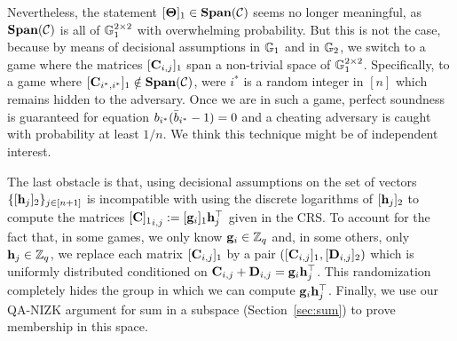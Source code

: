 Nevertheless, the statement $[\mathbf{{\Theta}}]_1\in\mathbf{Span}(\mathcal{C})$ seems no longer meaningful, as $\mathbf{Span}(\mathcal{C})$ is all of $\mathbb{G}_1^{2\times 2}$ with overwhelming probability. But this is not the case, because by means of decisional assumptions in $\mathbb{G}_1$ and in $\mathbb{G}_2$, we switch to a game where the matrices
$[\mathbf{{C}}_{i,j}]_1$ span a non-trivial space of $\mathbb{G}_1^{2 \times 2}$. Specifically, to a game where $[\mathbf{{C}}_{i^*,i^*}]_1\notin\mathbf{Span}(\mathcal{C})$, were $i^*$ is a random integer in $[n]$ which remains hidden to the adversary. Once we are in such a game, perfect soundness is guaranteed for equation $b_{i^*}(\bar{b}_{i^*}-1)=0$ and a cheating adversary is caught with probability at least $1/n$. We think this technique might be of independent interest.

The last obstacle is that, 
  using decisional assumptions on the set of vectors 
  $\{[\mathbf{h}_{j}]_2\}_{j\in[n+1]}$ is incompatible with using the discrete logarithms of $[\mathbf{h}_j]_2$ to compute the matrices ${[\mathbf{{C}}]_1}_{i,j}:=[\mathbf{g}_i]_1 \mathbf{h}_j^{\top}$ given in the CRS. 
To account for the fact that, in some games,
  we only know $\mathbf{g}_i \in \mathbb{Z}_q$ and, in some others,
  only $\mathbf{h}_j \in \mathbb{Z}_q$, we replace each matrix 
  $[\mathbf{{C}}_{i,j}]_1$ by a pair 
  $([\mathbf{{C}}_{i,j}]_1,[\mathbf{{D}}_{i,j}]_2)$ which is uniformly 
  distributed conditioned on 
  $\mathbf{{C}}_{i,j}+\mathbf{{D}}_{i,j}=\mathbf{g}_i \mathbf{h}_j^{\top}$.
This randomization completely hides the group in which we can compute 
  $\mathbf{g}_i \mathbf{h}_j^{\top}$. 
  Finally, we use our QA-NIZK argument for sum in a subspace (Section~\ref{sec:sum}) to prove membership in this space.

